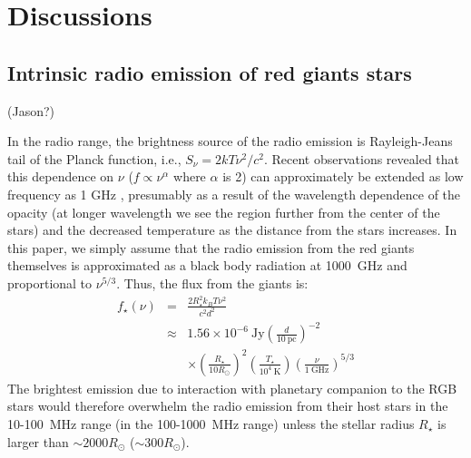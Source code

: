 \documentclass{emulateapj}
\begin{document}
\newpage

\section{Discussions}
\label{s:discussion}

\subsection{Intrinsic radio emission of red giants stars}
\label{ss:RGradio}

(Jason?)

In the radio range, the brightness source of the radio emission is Rayleigh-Jeans tail of the Planck function, i.e., $S_{\nu } = 2kT\nu^2/c^2$. Recent observations revealed that this dependence on $\nu$ ($f \propto \nu^{\alpha }$ where $\alpha $ is 2) can approximately be extended as low frequency as 1 GHz \citep{gorman2013}, presumably as a result of the wavelength dependence of the opacity (at longer wavelength we see the region further from the center of the stars) and the decreased temperature as the distance from the stars increases. 
In this paper, we simply assume that the radio emission from the red giants themselves is approximated as a black body radiation at 1000~GHz and proportional to $\nu ^{5/3}$. 
Thus, the flux from the giants is:
\begin{eqnarray}
f_{\star } (\nu ) &=& \frac{2R_{\star }^2 k_B T \nu^2}{c^2 d^2}  \\
&\approx & 1.56 \times 10^{-6} ~\mbox{Jy} \left( \frac{d}{10 ~\mbox{pc}} \right)^{-2} \\
&& \times \left( \frac{R_{\star }}{10 R_{\odot }} \right)^2 \left( \frac{T_{\star }}{10^{4}~\mbox{K}} \right) \left( \frac{\nu}{1~\mbox{GHz}} \right)^{5/3} 
\end{eqnarray}
The brightest emission due to interaction with planetary companion to the RGB stars would therefore overwhelm the radio emission from their host stars in the 10-100~MHz range (in the 100-1000~MHz range) unless the stellar radius $R_{\star }$ is larger than $\sim 2000R_{\odot }$ ($\sim 300R_{\odot }$). 
\end{document}
